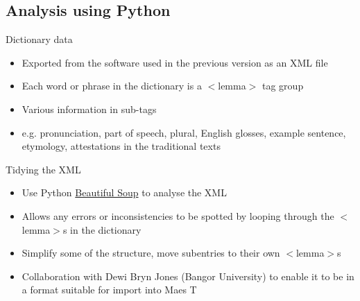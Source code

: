 \documentclass{beamer}
\begin{document}
\subsection{Analysis using Python}
\begin{frame}{Dictionary data}
 \begin{itemize}
  \item<1-> Exported from the software used in the previous version as an XML file
  \item<2-> Each word or phrase in the dictionary is a $<$lemma$>$ tag group
  \item<3-> Various information in sub-tags
  \item<4-> e.g. pronunciation, part of speech, plural, English glosses, example sentence, etymology, attestations in the traditional texts  
 \end{itemize}
 \end{frame}
\begin{frame}{Tidying the XML}
\begin{itemize}
  \item<1-> Use Python \href{https://www.crummy.com/software/BeautifulSoup/}{Beautiful Soup} to analyse the XML
  \item<2-> Allows any errors or inconsistencies to be spotted by looping through the $<$lemma$>$s in the dictionary     
  \item<3-> Simplify some of the structure, move subentries to their own $<$lemma$>$s
  \item<4-> Collaboration with Dewi Bryn Jones (Bangor University) to enable it to be in a format suitable for import into Maes T
\end{itemize}
\end{frame} 
\end{document}
